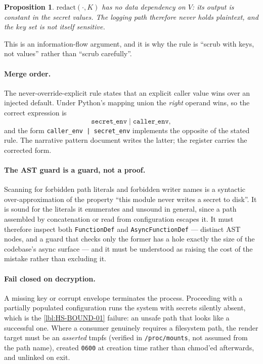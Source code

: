 \documentclass[11pt]{article}
\newtheorem{prop}{Proposition}[section]
\begin{document}
\begin{prop}
$\mathrm{redact}(\cdot, K)$ has no data dependency on $V$: its output is
constant in the secret values. The logging path therefore never holds
plaintext, and the key set is not itself sensitive.
\end{prop}

This is an information-flow argument, and it is why the rule is ``scrub with
keys, not values'' rather than ``scrub carefully''.

\paragraph{Merge order.} The never-override-explicit rule states that an
explicit caller value wins over an injected default. Under Python's mapping
union the \emph{right} operand wins, so the correct expression is
\begin{equation}
\mathtt{secret\_env} \mid \mathtt{caller\_env},
\end{equation}
and the form \texttt{caller\_env | secret\_env} implements the opposite of the
stated rule. The narrative pattern document writes the latter; the register
carries the corrected form.

\paragraph{The AST guard is a guard, not a proof.} Scanning for forbidden path
literals and forbidden writer names is a syntactic over-approximation of the
property ``this module never writes a secret to disk''. It is sound for the
literals it enumerates and unsound in general, since a path assembled by
concatenation or read from configuration escapes it. It must therefore inspect
both \texttt{FunctionDef} and \texttt{AsyncFunctionDef} --- distinct AST nodes,
and a guard that checks only the former has a hole exactly the size of the
codebase's async surface --- and it must be understood as raising the cost of
the mistake rather than excluding it.

\paragraph{Fail closed on decryption.} A missing key or corrupt envelope
terminates the process. Proceeding with a partially populated configuration
runs the system with secrets silently absent, which is the
\ref{lbl:HS-BOUND-01} failure: an unsafe path that looks like a successful one.
Where a consumer genuinely requires a filesystem path, the render target must be
an \emph{asserted} tmpfs (verified in \texttt{/proc/mounts}, not assumed from
the path name), created \texttt{0600} at creation time rather than chmod'ed
afterwards, and unlinked on exit.
\end{document}
